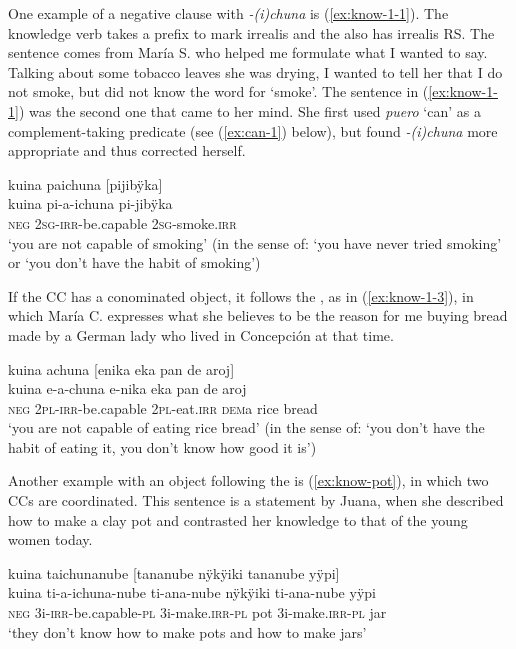 One example of a negative clause with \textit{-(i)chuna} is (\ref{ex:know-1-1}). The knowledge verb takes a prefix to mark irrealis and the  also has irrealis RS.
The sentence comes from María S. who helped me formulate what I wanted to say. Talking about some tobacco leaves she was drying, I wanted to tell her that I do not smoke, but did not know the word for ‘smoke’. The sentence in (\ref{ex:know-1-1}) was the second one that came to her mind. She first used \textit{puero} ‘can’ as a complement-taking predicate (see (\ref{ex:can-1}) below), but found \textit{-(i)chuna} more appropriate and thus corrected herself.

\ea\label{ex:know-1-1}
\begingl
\glpreamble kuina paichuna \textup{[}pijibÿka\textup{]}\\
\gla kuina pi-a-ichuna pi-jibÿka\\
\glb \textsc{neg} 2\textsc{sg}-\textsc{irr}-be.capable 2\textsc{sg}-smoke.\textsc{irr}\\
\glft ‘you are not capable of smoking’ (in the sense of: ‘you have never tried smoking’ or ‘you don’t have the habit of smoking’)
\endgl
\trailingcitation{[rxx-e120511l.381]}
\xe

If the CC has a conominated object, it follows the , as in (\ref{ex:know-1-3}), in which María C. expresses what she believes to be the reason for me buying bread made by a German lady who lived in Concepción at that time.

\ea\label{ex:know-1-3}
\begingl
\glpreamble kuina achuna \textup{[}enika eka pan de aroj\textup{]}\\
\gla kuina e-a-chuna e-nika eka {pan de aroj}\\
\glb \textsc{neg} 2\textsc{pl}-\textsc{irr}-be.capable 2\textsc{pl}-eat.\textsc{irr} \textsc{dem}a {rice bread}\\
\glft ‘you are not capable of eating rice bread’ (in the sense of: ‘you don’t have the habit of eating it, you don’t know how good it is’)
\endgl
\trailingcitation{[uxx-e120427l.128]}
\xe

Another example with an object following the  is (\ref{ex:know-pot}), in which two CCs are coordinated. This sentence is a statement by Juana, when she described how to make a clay pot and contrasted her knowledge to that of the young women today.

\ea\label{ex:know-pot}
\begingl
\glpreamble kuina taichunanube \textup{[}tananube nÿkÿiki tananube yÿpi\textup{]}\\
\gla kuina ti-a-ichuna-nube ti-ana-nube nÿkÿiki ti-ana-nube yÿpi\\
\glb \textsc{neg} 3i-\textsc{irr}-be.capable-\textsc{pl} 3i-make.\textsc{irr}-\textsc{pl} pot 3i-make.\textsc{irr}-\textsc{pl} jar\\
\glft ‘they don’t know how to make pots and how to make jars’
\endgl
\trailingcitation{[jxx-p120430l-2.549]}
\xe


